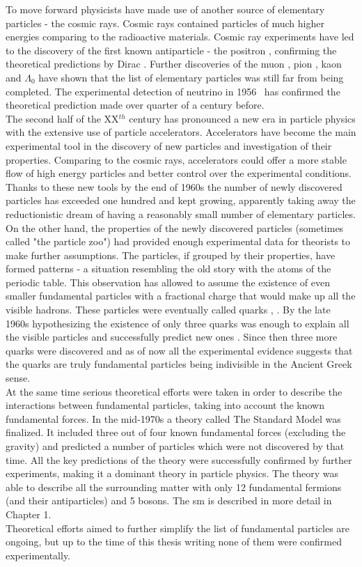 To move forward physicists have made use of another source of elementary particles - the cosmic rays. Cosmic rays contained particles of much higher energies comparing to the radioactive materials. Cosmic ray experiments have led to the discovery of the first known antiparticle - the positron \cite{positron_exp}, confirming the theoretical predictions by Dirac \cite{positron_th}. Further discoveries of the muon \cite{muon_exp}, pion \cite{pion}, kaon \cite{kaon} and $\Lambda_0$ \cite{lambda0} have shown that the list of elementary particles was still far from being completed. The experimental detection of neutrino in 1956~\cite{neutrino} has confirmed the theoretical prediction made over quarter of a century before.  \\
The second half of the XX$^{th}$ century has pronounced a new era in particle physics with the extensive use of particle accelerators. Accelerators have become the main experimental tool in the discovery of new particles and investigation of their properties. Comparing to the cosmic rays, accelerators could offer a more stable flow of high energy particles and better control over the experimental conditions. Thanks to these new tools by the end of 1960s the number of newly discovered particles has exceeded one hundred and kept growing, apparently taking away the reductionistic dream of having a reasonably small number of elementary particles. \\
On the other hand, the properties of the newly discovered particles (sometimes called "the particle zoo") had provided enough experimental data for theorists to make further assumptions. The particles, if grouped by their properties, have formed patterns - a situation resembling the old story with the atoms of the periodic table. This observation has allowed to assume the existence of even smaller fundamental particles with a fractional charge that would make up all the visible hadrons. These particles were eventually called quarks \cite{gellMann}, \cite{zweig}. By the late 1960s hypothesizing the existence of only three quarks was enough to explain all the visible particles and successfully predict new ones \cite{omega}. Since then three more quarks were discovered and as of now all the experimental evidence suggests that the quarks are truly fundamental particles being indivisible in the Ancient Greek sense. \\
At the same time serious theoretical efforts were taken in order to describe the interactions between fundamental particles, taking into account the known fundamental forces. In the mid-1970s a theory called The Standard Model was finalized. It included three out of four known fundamental forces (excluding the gravity) and predicted a number of particles which were not discovered by that time. All the key predictions of the theory were successfully confirmed by further experiments, making it a dominant theory in particle physics. The theory was able to describe all the surrounding matter with only 12 fundamental fermions (and their antiparticles) and 5 bosons. The \gls{sm} is described in more detail in Chapter 1.\\
Theoretical efforts aimed to further simplify the list of fundamental particles are ongoing, but up to the time of this thesis writing none of them were confirmed experimentally. 
